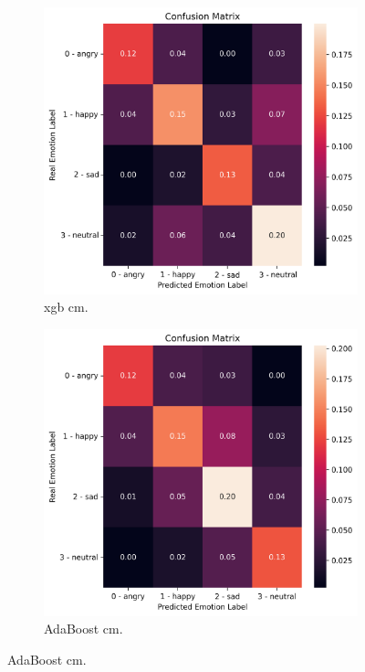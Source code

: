 \begin{figure}[H]
	\begin{subfigure}{.5\textwidth}
		\centering
		\includegraphics[width=.9\linewidth]{figs/appendix/feature_selection/XGBoostCM.png}
		\caption{\ac{xgb} \ac{cm}.}
	\end{subfigure}%
	\begin{subfigure}{.5\textwidth}
		\centering
		\includegraphics[width=.9\linewidth]{figs/appendix/feature_selection/AdaBoostCM.png}
		\caption{AdaBoost \ac{cm}.}
	\end{subfigure}

\end{figure}
